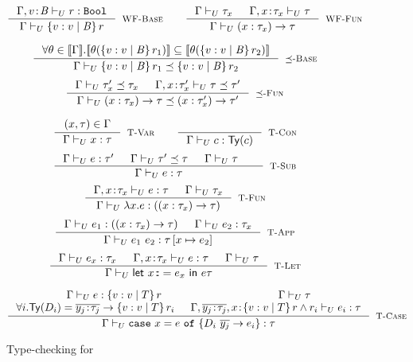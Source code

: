\newcommand\restrictdecidable[2]{#2}
\begin{figure}[t!]
\centering
\captionsetup{justification=centering}

$$
\inference
   {\undechastype{\Gamma, \tbind{v}{\Base}}
                 {\restrictdecidable{p}{r}}{\tbool}
   }
   {\undeciswellformed{\Gamma}{\tref{v}{\Base}{}{\restrictdecidable{p}{r}}}}
   [\rwbase]
\qquad
\inference{
	\undeciswellformed{\Gamma}{\tau_x} &&
	\undeciswellformed{\Gamma, \tbind{x}{\tau_x}}{\tau}
}{
	\undeciswellformed{\Gamma}{\tfunref{x}{\tau_x}{\tau}{v}{e}}
}[\rwfun]
$$


$$
\inference{
  {\forall \sto\in \interp{\Env}. 
  		 \interp{\thetasub{\sto}{\tref{v}{\Base}{}{\restrictdecidable{p_1}{r_1}}}} 
  		\subseteq   \interp{\thetasub{\sto}{\tref{v}{\Base}{}{\restrictdecidable{p_2}{r_2}}}}}
}{
	\undecissubtype{\Gamma}
		{\tref{v}{\Base}{}{\restrictdecidable{p_1}{r_1}}}
		{\tref{v}{\Base}{}{\restrictdecidable{p_2}{r_2}}}
}[\rsubbase]
$$
$$
\inference{
	\undecissubtype{\Gamma}{\tau'_x}{\tau_x} &&
	\undecissubtype{\Gamma, \tbind{x}{\tau'_x}}{\tau}{\tau'}
}{
	\undecissubtype{\Gamma}{\tfunref{x}{\tau_x}{\tau}{v}{e_1}}{\tfunref{x}{\tau'_x}{\tau'}{v}{e_2}}
}[\rsubfun]
$$

$$
\inference{
	(x,\tau) \in \Gamma 
}{
	\undechastype{\Gamma}{x}{\tau}
}[\rtvar]
\qquad
\inference{
}{
	\undechastype{\Gamma}{c}{\constty{c}}
}[\rtconst]
$$
$$
\inference{
	\undechastype{\Gamma}{e}{\tau'} &&
	\undecissubtype{\Gamma}{\tau'}{\tau} &&
	\undeciswellformed{\Gamma}{\tau} &&
}{
	\undechastype{\Gamma}{e}{\tau}
}[\rtsub]
$$
$$
\inference{
	\undechastype{\Gamma, \tbind{x}{\tau_x}}{e}{\tau} &&
	\undeciswellformed{\Gamma}{\tau_x}
}{
	\undechastype{\Gamma}{\efun{x}{\tau_x}{e}}{(\tfun{x}{\tau_x}{\tau})}
}[\rtfun]
$$
$$
\inference{
	\undechastype{\Gamma}{e_1}{(\tfunref{x}{\tau_{x}}{\tau}{v}{e_v})} &&
	\undechastype{\Gamma}{\restrictdecidable{y}{e_2}}{\tau_{x}}
}{
	\undechastype{\Gamma}{\eapp{e_1}{\restrictdecidable{y}{e_2}}}{\tau\sub{x}{\restrictdecidable{y}{e_2}}}
}[\rtapp]
$$
$$
\inference{
	\undechastype{\Gamma}{e_x}{\tau_{x}} &&
	\undechastype{\Gamma,\tbind{x}{\tau_x}}{e}{\tau} &&
	\undeciswellformed{\Gamma}{\tau}
}{
	\undechastype{\Gamma}{\elet{x}{e_x}{e}}{\tau}
}[\rtlet]
$$

$$\inference{
	\undechastype{\Gamma}{e}{\tref{v}{T}{}{r}} &&
	 \undeciswellformed{\Gamma}{\tau}\\
     \forall i. \constty{D_i} = \overline{\tbind{y_j}{\tau_j}} \rightarrow \tref{v}{T}{}{r_i} &&
      \undechastype{\Gamma, \overline{\tbind{y_j}{\tau_j}}, \tbind{x}{\tref{v}{T}{}{r \land r_i}}}{e_i}{\tau}  \\
}{
	\undechastype{\Gamma}{\ecase{e}{D_i}{\overline{y_j}}{e_i}{x}}{\tau}
}[\rtcase]$$
\caption{Type-checking for \undeclang}
\label{fig:typing}
\end{figure}

